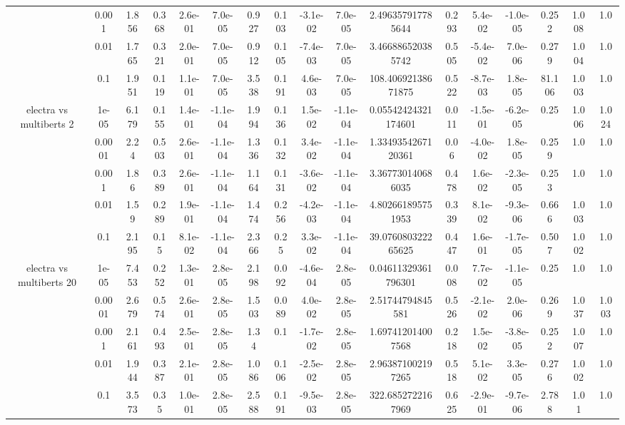 \begin{tabular}{|c|c|c|c|c|c|c|c|c|c|c|c|c|c|c|c|c|}
 & 0.001 & 1.856 & 0.368 & 2.6e-01 & 7.0e-05 & 0.927 & 0.103 & -3.1e-02 & 7.0e-05 & 2.496357917785644 & 0.293 & 5.4e-02 & -1.0e-05 & 0.252 & 1.008 & 1.0 \\
 & 0.01 & 1.765 & 0.321 & 2.0e-01 & 7.0e-05 & 0.912 & 0.105 & -7.4e-03 & 7.0e-05 & 3.466886520385742 & 0.505 & -5.4e-02 & 7.0e-06 & 0.279 & 1.004 & 1.0 \\
 & 0.1 & 1.951 & 0.119 & 1.1e-01 & 7.0e-05 & 3.538 & 0.191 & 4.6e-03 & 7.0e-05 & 108.40692138671875 & 0.522 & -8.7e-03 & 1.8e-05 & 81.106 & 1.003 & 1.0 \\
\hline
\multirow{5}{*}{electra  vs multiberts 2} & 1e-05 & 6.179 & 0.155 & 1.4e-01 & -1.1e-04 & 1.994 & 0.136 & 1.5e-02 & -1.1e-04 & 0.05542424321174601 & 0.011 & -1.5e-01 & -6.2e-05 & 0.25 & 1.006 & 1.024 \\
 & 0.0001 & 2.24 & 0.503 & 2.6e-01 & -1.1e-04 & 1.336 & 0.132 & 3.4e-02 & -1.1e-04 & 1.3349354267120361 & 0.06 & -4.0e-02 & 1.8e-05 & 0.259 & 1.0 & 1.0 \\
 & 0.001 & 1.86 & 0.389 & 2.6e-01 & -1.1e-04 & 1.164 & 0.131 & -3.6e-02 & -1.1e-04 & 3.367730140686035 & 0.478 & 1.6e-02 & -2.3e-05 & 0.253 & 1.0 & 1.0 \\
 & 0.01 & 1.59 & 0.289 & 1.9e-01 & -1.1e-04 & 1.474 & 0.256 & -4.2e-03 & -1.1e-04 & 4.802661895751953 & 0.339 & 8.1e-02 & -9.3e-06 & 0.666 & 1.003 & 1.0 \\
 & 0.1 & 2.195 & 0.15 & 8.1e-02 & -1.1e-04 & 2.366 & 0.25 & 3.3e-02 & -1.1e-04 & 39.076080322265625 & 0.447 & 1.6e-01 & -1.7e-05 & 0.507 & 1.002 & 1.0 \\
\hline
\multirow{5}{*}{electra  vs multiberts 20} & 1e-05 & 7.453 & 0.252 & 1.3e-01 & 2.8e-05 & 2.198 & 0.092 & -4.6e-04 & 2.8e-05 & 0.04611329361796301 & 0.008 & 7.7e-02 & -1.1e-05 & 0.25 & 1.0 & 1.0 \\
 & 0.0001 & 2.679 & 0.574 & 2.6e-01 & 2.8e-05 & 1.503 & 0.089 & 4.0e-02 & 2.8e-05 & 2.51744794845581 & 0.526 & -2.1e-02 & 2.0e-06 & 0.269 & 1.037 & 1.003 \\
 & 0.001 & 2.161 & 0.493 & 2.5e-01 & 2.8e-05 & 1.34 & 0.1 & -1.7e-02 & 2.8e-05 & 1.697412014007568 & 0.218 & 1.5e-02 & -3.8e-05 & 0.252 & 1.007 & 1.0 \\
 & 0.01 & 1.944 & 0.387 & 2.1e-01 & 2.8e-05 & 1.086 & 0.106 & -2.5e-02 & 2.8e-05 & 2.963871002197265 & 0.518 & 5.1e-02 & 3.3e-05 & 0.276 & 1.002 & 1.0 \\
 & 0.1 & 3.573 & 0.35 & 1.0e-01 & 2.8e-05 & 2.588 & 0.191 & -9.5e-03 & 2.8e-05 & 322.6852722167969 & 0.625 & -2.9e-01 & -9.7e-06 & 2.788 & 1.01 & 1.0 \\

\end{tabular}
